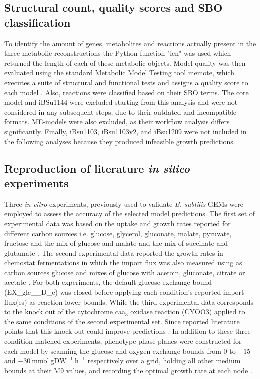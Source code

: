 \documentclass[11pt, a4paper]{article}
\begin{document}
\subsection{Structural count, quality scores and SBO classification}
To identify the amount of genes, metabolites and reactions actually present in the three metabolic reconstructions the Python function "len" was used which returned the length of each of these metabolic objects.  
Model quality was then evaluated using the standard Metabolic Model Testing tool memote, which executes a suite of structural and functional tests and assigns a quality score to each model \parencite{lieven-2020}. Also, reactions were classified based on their SBO terms.
The core model and iBSu1144 were excluded starting from this analysis and were not considered in any subsequent steps, due to their outdated and incompatible formats. ME-models were also excluded, as their workflow analysis differs significantly. Finally, iBsu1103, iBsu1103v2, and iBsu1209 were not included in the following analyses because they produced infeasible growth predictions.

\subsection{Reproduction of literature \textit{in silico} experiments}
Three \textit{in vitro} experiments, previously used to validate \textit{B. subtilis} GEMs were employed to assess the accuracy of the selected model predictions. The first set of experimental data was based on the uptake and growth rates reported for different carbon sources i.e. glucose, glycerol, gluconate, malate, pyruvate, fructose and the mix of glucose and malate and the mix of succinate and glutamate \parencite{chubukov-2013}. The second experimental data reported the growth rates in chemostat fermentations in which the import flux was also measured using as carbon sources glucose and mixes of glucose with acetoin, gluconate, citrate or acetate \parencite{dauner-2001C}. For both experiments, the default glucose exchange bound (EX\_glc\_\_D\_e) was closed before applying each condition's reported import flux(es) as reaction lower bounds.
While the third experimental data corresponds to the knock out of the cytochrome caa$_3$ oxidase reaction (CYOO3) applied to the same conditions of the second experimental set. Since reported literature points that this knock out could improve predictions \parencite{oh-2007}. 
In addition to these three condition-matched experiments, phenotype phase planes were constructed for each model by scanning the glucose and oxygen exchange bounds from 0 to \(-15\) and \(-30\ \mathrm{mmol\ gDW^{-1}\ h^{-1}}\) respectively over a grid, holding all other medium bounds at their M9 values, and recording the optimal growth rate at each node \parencite{edwards-2001}.
\end{document}
